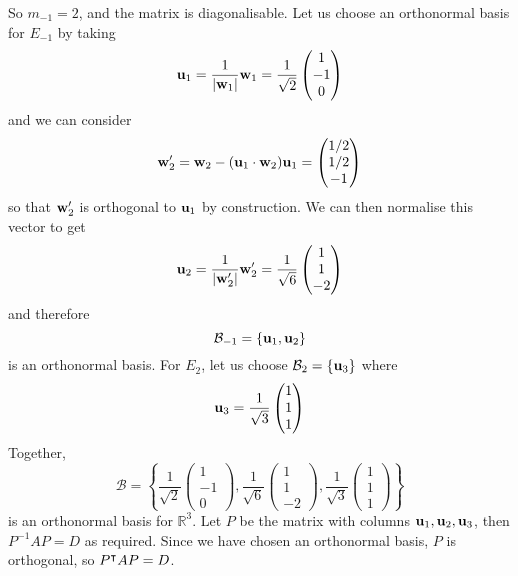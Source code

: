 \begin{enumerate}[(i)]
\[	      \]
	      So \(m_{-1} = 2\), and the matrix is diagonalisable.
	      Let us choose an orthonormal basis for \(E_{-1}\) by taking
	      \[
		      \vb u_1 = \frac{1}{\abs{\vb w_1}}\vb w_1 = \frac{1}{\sqrt 2}\begin{pmatrix}
			      1 \\ -1 \\ 0
		      \end{pmatrix}
	      \]
	      and we can consider
	      \[
		      \vb w_2' = \vb w_2 - (\vb u_1 \cdot \vb w_2)\vb u_1 = \begin{pmatrix}
			      1/2 \\ 1/2 \\ -1
		      \end{pmatrix}
	      \]
	      so that \(\vb w_2'\) is orthogonal to \(\vb u_1\) by construction.
	      We can then normalise this vector to get
	      \[
		      \vb u_2 = \frac{1}{\abs{\vb w_2'}}\vb w_2' = \frac{1}{\sqrt 6} \begin{pmatrix}
			      1 \\ 1 \\ -2
		      \end{pmatrix}
	      \]
	      and therefore
	      \[
		      \mathcal B_{-1} = \{ \vb u_1, \vb u_2 \}
	      \]
	      is an orthonormal basis.
	      For \(E_2\), let us choose \(\mathcal B_2 = \{ \vb u_3 \}\) where
	      \[
		      \vb u_3 = \frac{1}{\sqrt 3}\begin{pmatrix}
			      1 \\ 1 \\ 1
		      \end{pmatrix}
	      \]
	      Together,
	      \[
		      \mathcal B = \left\{ \frac{1}{\sqrt 2}\begin{pmatrix}
			      1 \\ -1 \\ 0
		      \end{pmatrix}, \frac{1}{\sqrt 6} \begin{pmatrix}
			      1 \\ 1 \\ -2
		      \end{pmatrix}, \frac{1}{\sqrt 3}\begin{pmatrix}
			      1 \\ 1 \\ 1
		      \end{pmatrix} \right\}
	      \]
	      is an orthonormal basis for \(\mathbb R^3\).
	      Let \(P\) be the matrix with columns \(\vb u_1, \vb u_2, \vb u_3\), then \(P^{-1}AP = D\) as required.
	      Since we have chosen an orthonormal basis, \(P\) is orthogonal, so \(P^\intercal AP = D\).
\end{enumerate}

